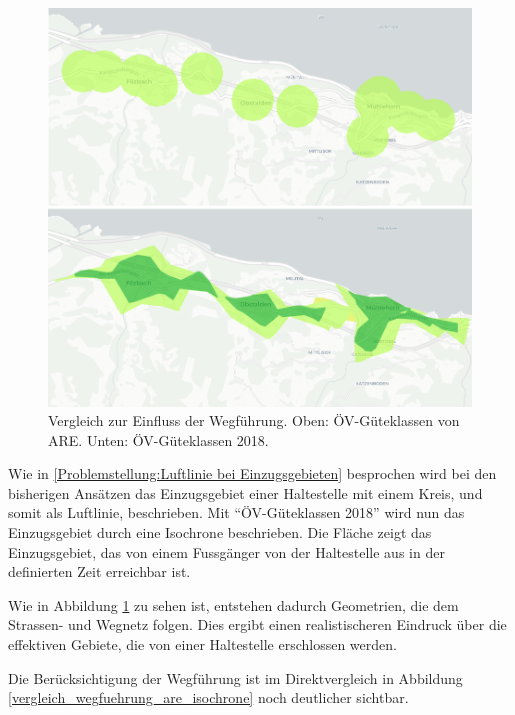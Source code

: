 \begin{figure}[ht]
    \centering
    \includegraphics[width=0.8\linewidth]{technicalreport/img/vergleich_wegfuehrung}
    \caption[Vergleich zur Einfluss der Wegführung]{Vergleich zur Einfluss der Wegführung. Oben: ÖV-Güteklassen von \ac{ARE}. Unten: ÖV-Güteklassen 2018.}
    \label{fig:vergleich_wegfuehrung}
\end{figure}

Wie in \ref{Problemstellung:Luftlinie bei Einzugsgebieten} besprochen wird bei den bisherigen Ansätzen das Einzugsgebiet einer Haltestelle mit einem Kreis, und somit als Luftlinie, beschrieben.
Mit "`\acs{ÖV}-Güteklassen 2018"' wird nun das Einzugsgebiet durch eine \gls{Isochrone} beschrieben.
Die Fläche zeigt das Einzugsgebiet, das von einem Fussgänger von der Haltestelle aus in der definierten Zeit erreichbar ist.

Wie in Abbildung \ref{fig:vergleich_wegfuehrung} zu sehen ist, entstehen dadurch Geometrien, die dem Strassen- und Wegnetz folgen.
Dies ergibt einen realistischeren Eindruck über die effektiven Gebiete, die von einer Haltestelle erschlossen werden.

Die Berücksichtigung der Wegführung ist im Direktvergleich in Abbildung \ref{vergleich_wegfuehrung_are_isochrone} noch deutlicher sichtbar.

